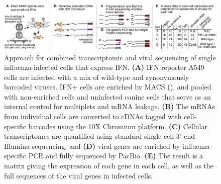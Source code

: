 \documentclass[9pt,lineno]{elife}
\begin{document}
\begin{figure}
\begin{fullwidth}

\includegraphics[width=\linewidth, valign=t]{figures/WorkflowSchematic/SchematicForPaper.pdf}

\caption{
Approach for combined transcriptomic and viral sequencing of single influenza-infected cells that express IFN.
{\bf (A)}
IFN reporter A549 cells are infected with a mix of wild-type and synonymously barcoded viruses.
IFN+ cells are enriched by MACS (), and pooled with non-enriched cells and uninfected canine cells that serve as an internal control for multiplets and mRNA leakage.
{\bf (B)}
The mRNAs from individual cells are converted to cDNAs tagged with cell-specific barcodes using the 10X Chromium platform.
{\bf (C)}
Cellular transcriptomes are quantified using standard single-cell 3'-end Illumina sequencing, and 
{\bf (D)}
viral genes are enriched by influenza-specific PCR and fully sequenced by PacBio.
{\bf (E)}
The result is a matrix giving the expression of each gene in each cell, as well as the full sequences of the viral genes in infected cells.
}
\label{fig:workflow}


\end{fullwidth}
\end{figure}
\end{document}
